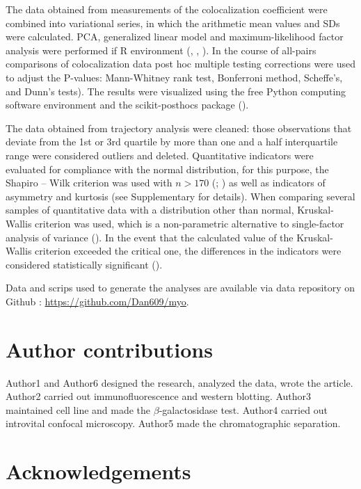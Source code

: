 \documentclass[alpha-refs]{wiley-article}
\begin{document}
The data obtained from measurements of the colocalization coefficient were combined into variational series, in which the arithmetic mean values and SDs were calculated.
PCA, generalized linear model and maximum-likelihood factor analysis were performed if R environment (\cite{husson2010exploratory}, \cite{dobson2008introduction}, \cite{lawley1971factor}).
In the course of all-pairs comparisons of colocalization data post hoc multiple testing corrections were used to adjust the P-values: Mann-Whitney rank test, Bonferroni method, Scheffe’s, and Dunn’s tests).
The results were visualized using the free Python computing software environment and the scikit-posthocs package (\cite{Terpilowski2019}).

The data obtained from trajectory analysis were cleaned: those observations that deviate from the 1st or 3rd quartile by more than one and a half interquartile range were considered outliers and deleted.
Quantitative indicators were evaluated for compliance with the normal distribution, for this purpose, the Shapiro – Wilk criterion  was used with $n > 170$ (\cite{shapiro1965analysis}; \cite{shapiro1972approximate}) as well as indicators of asymmetry and kurtosis (see Supplementary for details).
When comparing several samples of quantitative data with a distribution other than normal, Kruskal-Wallis criterion was used, which is a non-parametric alternative to single-factor analysis of variance (\cite{kruskal1952use}).
In the event that the calculated value of the Kruskal-Wallis criterion exceeded the critical one, the differences in the indicators were considered statistically significant (\cite{wilcoxon1992individual}).

Data and scrips used to generate the analyses are available via data repository on Github : \url{https://github.com/Dan609/myo}.


\section*{Author contributions}

Author1 and Author6 designed the research, analyzed the data, wrote the article.
Author2 carried out immunofluorescence and western blotting.
Author3 maintained cell line and made the $\beta$-galactosidase test.
Author4 carried out introvital confocal microscopy.
Author5 made the chromatographic separation.

\section*{Acknowledgements}
\end{document}
